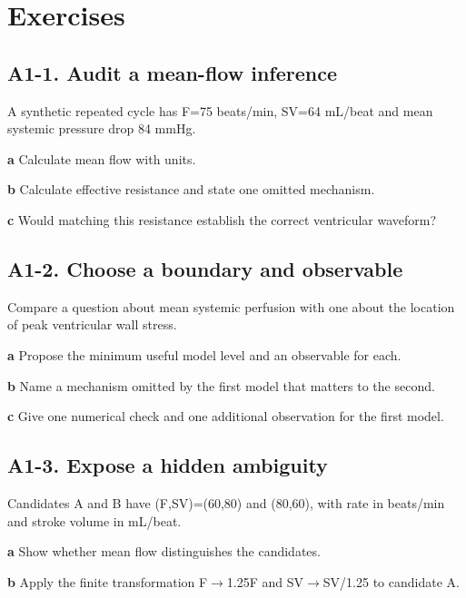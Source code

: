 \documentclass[11pt,letterpaper]{article}
\theoremstyle{definition}\newtheorem{definition}{Definition}\newtheorem{example}{Example}
\numberwithin{equation}{section}
\begin{document}
\section*{Exercises}
\par\noindent\begin{minipage}{\linewidth}
\subsection*{A1-1. Audit a mean-flow inference}
A synthetic repeated cycle has F=\allowbreak{}75 beats/min, SV=\allowbreak{}64 mL/beat and mean systemic pressure drop 84 mmHg.

\textbf{a} Calculate mean flow with units.

\end{minipage}\par\medskip
\textbf{b} Calculate effective resistance and state one omitted mechanism.

\textbf{c} Would matching this resistance establish the correct ventricular waveform?

\par\noindent\begin{minipage}{\linewidth}
\subsection*{A1-2. Choose a boundary and observable}
Compare a question about mean systemic perfusion with one about the location of peak ventricular wall stress.

\textbf{a} Propose the minimum useful model level and an observable for each.

\end{minipage}\par\medskip
\textbf{b} Name a mechanism omitted by the first model that matters to the second.

\textbf{c} Give one numerical check and one additional observation for the first model.

\par\noindent\begin{minipage}{\linewidth}
\subsection*{A1-3. Expose a hidden ambiguity}
Candidates A and B have (F,SV)=\allowbreak{}(60,80) and (80,60), with rate in beats/min and stroke volume in mL/beat.

\textbf{a} Show whether mean flow distinguishes the candidates.

\end{minipage}\par\medskip
\textbf{b} Apply the finite transformation F$\to$1.25F and SV$\to$SV/1.25 to candidate A.
\end{document}
